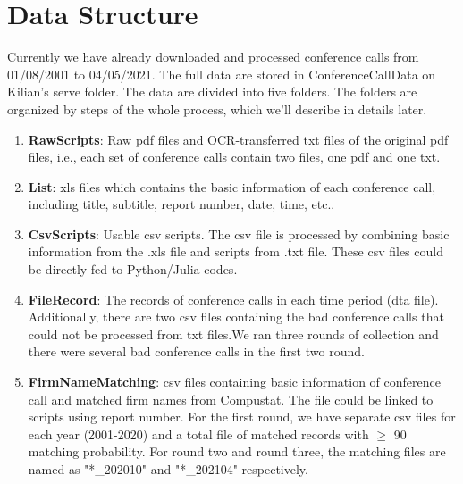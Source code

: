 \documentclass[11pt]{article}
\newcounter{file}
\begin{document}
\section{Data Structure}
\par Currently we have already downloaded and processed conference calls from 01/08/2001 to 04/05/2021. The full data are stored in ConferenceCallData on Kilian's serve folder. The data are divided into five folders. The folders are organized by steps of the whole process, which we'll describe in details later.
\begin{enumerate}
	\item \textbf{RawScripts}: Raw pdf files and OCR-transferred txt files of the original pdf files, i.e., each set of conference calls contain two files, one pdf and one txt.
	\item \textbf{List}: xls files which contains the basic information of each conference call, including title, subtitle, report number, date, time, etc..
	\item \textbf{CsvScripts}: Usable csv scripts. The csv file is processed by combining basic information from the .xls file and scripts from .txt file. These csv files could be directly fed to Python/Julia codes.
	\item \textbf{FileRecord}: The records of conference calls in each time period (dta file). Additionally, there are two csv files containing the bad conference calls that could not be processed from txt files.We ran three rounds of collection and there were several bad conference calls in the first two round.
	\item \textbf{FirmNameMatching}: csv files containing basic information of conference call and matched firm names from Compustat. The file could be linked to scripts using report number. For the first round, we have separate csv files for each year (2001-2020) and a total file of matched records with $\geq$ 90 matching probability. For round two and round three, the matching files are named as "*\_202010" and "*\_202104" respectively.
\end{enumerate}
\end{document}
